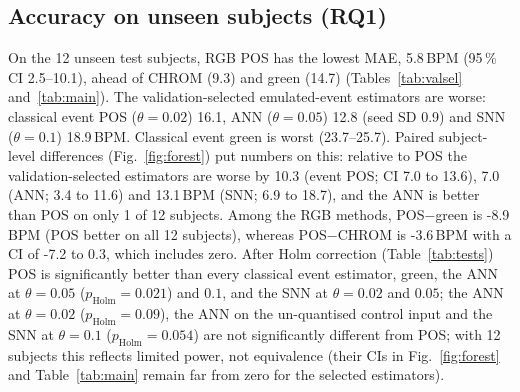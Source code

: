\documentclass[10pt,journal]{IEEEtran}
\begin{document}
\subsection{Accuracy on unseen subjects (RQ1)}
\begin{table}[t]\centering\caption{Validation and test MAE (BPM). The threshold with the lowest validation MAE for each event-based family is in bold; test numbers for the other thresholds are shown for completeness and were not used for selection.}\label{tab:valsel}\scriptsize
\resizebox{\columnwidth}{!}{}
\end{table}
On the 12 unseen test subjects, RGB POS has the lowest MAE, 5.8\,BPM (95\,\% CI 2.5--10.1), ahead of CHROM (9.3) and green (14.7) (Tables~\ref{tab:valsel} and~\ref{tab:main}). The validation-selected emulated-event estimators are worse: classical event POS ($\theta=0.02$) 16.1, ANN ($\theta=0.05$) 12.8 (seed SD 0.9) and SNN ($\theta=0.1$) 18.9\,BPM. Classical event green is worst (23.7--25.7).
Paired subject-level differences (Fig.~\ref{fig:forest}) put numbers on this: relative to POS the validation-selected estimators are worse by 10.3 (event POS; CI 7.0 to 13.6), 7.0 (ANN; 3.4 to 11.6) and 13.1\,BPM (SNN; 6.9 to 18.7), and the ANN is better than POS on only 1 of 12 subjects. Among the RGB methods, POS$-$green is -8.9\,BPM (POS better on all 12 subjects), whereas POS$-$CHROM is -3.6\,BPM with a CI of -7.2 to 0.3, which includes zero.
After Holm correction (Table~\ref{tab:tests}) POS is significantly better than every classical event estimator, green, the ANN at $\theta=0.05$ ($p_{\mathrm{Holm}}=0.021$) and $0.1$, and the SNN at $\theta=0.02$ and $0.05$; the ANN at $\theta=0.02$ ($p_{\mathrm{Holm}}=0.09$), the ANN on the un-quantised control input and the SNN at $\theta=0.1$ ($p_{\mathrm{Holm}}=0.054$) are not significantly different from POS; with 12 subjects this reflects limited power, not equivalence (their CIs in Fig.~\ref{fig:forest} and Table~\ref{tab:main} remain far from zero for the selected estimators).
\begin{table}[t]\centering\caption{Held-out test subjects: HR error (BPM, mean over subjects, 95\% CI over subjects; $\pm$ = SD over training seeds), pooled-window agreement and energy proxy per 10\,s window.}\label{tab:main}\scriptsize
\resizebox{\columnwidth}{!}{}
\end{table}
\begin{table}[t]\centering\caption{Paired Wilcoxon tests over subjects (Holm-corrected over all listed comparisons).}\label{tab:tests}\scriptsize
\resizebox{\columnwidth}{!}{}
\end{table}
\end{document}
